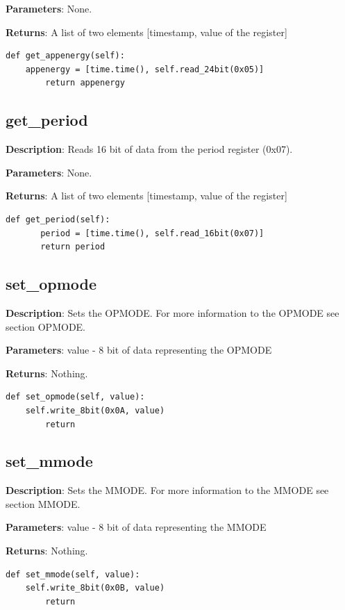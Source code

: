 \documentclass{scrartcl}  %
\begin{document}
\textbf{Parameters}: None.

\textbf{Returns}: A list of two elements [timestamp, value of the register]
\begin{lstlisting}	
def get_appenergy(self):
	appenergy = [time.time(), self.read_24bit(0x05)]
    	return appenergy
\end{lstlisting}
 
\subsection{get_period}   

\textbf{Description}: Reads 16 bit of data from the period register (0x07).

\textbf{Parameters}: None.

\textbf{Returns}: A list of two elements [timestamp, value of the register]
\begin{lstlisting}
def get_period(self):
       period = [time.time(), self.read_16bit(0x07)]
       return period
\end{lstlisting}
		
\subsection{set_opmode}

\textbf{Description}: Sets the OPMODE. For more information to the OPMODE see section OPMODE.

\textbf{Parameters}: value - 8 bit of data representing the OPMODE

\textbf{Returns}: Nothing.

\begin{lstlisting}
def set_opmode(self, value):
	self.write_8bit(0x0A, value)
    	return
\end{lstlisting}

\subsection{set_mmode}

\textbf{Description}: Sets the MMODE. For more information to the MMODE see section MMODE.

\textbf{Parameters}: value - 8 bit of data representing the MMODE

\textbf{Returns}: Nothing.

\begin{lstlisting}
def set_mmode(self, value):
	self.write_8bit(0x0B, value)
    	return
\end{lstlisting}
\end{document}
